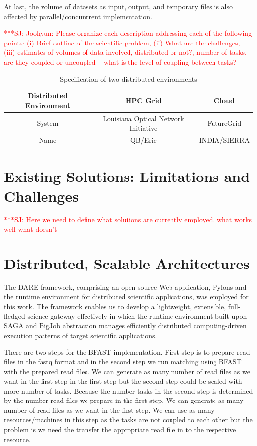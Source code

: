 \documentclass[12pt]{article}
\newcommand{\jhanote}[1]{ {\textcolor{red}     {***SJ: #1}}}
\newcommand{\jhanote}[1]{}
\begin{document}
At last, the volume of datasets as input, output, and temporary files is also affected by parallel/concunrrent implementation.




\jhanote{Joohyun: Please organize each description addressing each of
  the following points: (i) Brief outline of the scientific problem,
  (ii) What are the challenges, (iii) estimates of volumes of data
  involved, distributed or not?, number of tasks, are they coupled or
  uncoupled -- what is the level of coupling between tasks?}


 \begin{table}
 \begin{tabular}{|c|cc|} 
 \hline 
Distributed Environment &  HPC Grid &  Cloud \\ \hline
System  &  Louisiana Optical Network Initiative & FutureGrid \\
Name &  QB/Eric   &  INDIA/SIERRA \\
 \hline
 \end{tabular}
\caption{Specification of two distributed environments}
\label{table:two-systems} 
\end{table}
 
 
\section{Existing Solutions: Limitations and Challenges}

\jhanote{Here we need to define what solutions are currently employed, what works well
  what doesn't}

\section{Distributed, Scalable Architectures}

The DARE framework, comprising an open source Web application, Pylons
and the runtime environment for distributed scientific applications,
was employed for this work.  The framework enables us to develop a
lightweight, extensible, full-fledged science gateway effectively in
which the runtime environment built upon SAGA and BigJob abstraction
manages efficiently distributed computing-driven execution patterns of
target scientific applications.

There are two steps for the BFAST implementation. First step is to prepare read files in the 
fastq format and in the second step we run matching using BFAST with the prepared read files.
 We can generate as many number of read files as we want in the first step in the first step
 but the second step could be scaled with more number of tasks. Because the number tasks 
 in the second step is determined by the number read files we prepare in the first step. We 
 can generate as many number of read files as we want in the first step. We can use as many resources/machines 
 in this step as the tasks are not coupled to each other but the problem is we need the transfer the appropriate read file
in to the respective resource.
\end{document}
